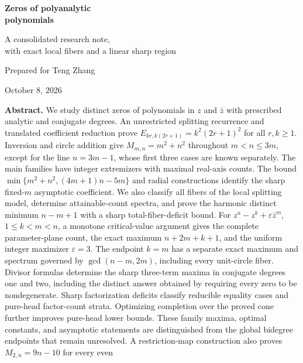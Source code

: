 \documentclass[UTF8,11pt]{ctexart}
\theoremstyle{definition}
\numberwithin{equation}{section}
\begin{document}
\begin{titlepage}
\centering
\vspace*{0.5cm}
{\Huge\bfseries\color{MidnightBlue} Zeros of polyanalytic\\[0.25em] polynomials\par}
\vspace{0.6cm}
{\Large A consolidated research note,\\[0.25em] with exact local fibers and a linear sharp region\par}
\vspace{0.7cm}
{\large Prepared for Teng Zhang\par}
\vspace{0.5cm}
{\large October 8, 2026\par}
\vfill
\begin{tcolorbox}[colback=MidnightBlue!4,colframe=MidnightBlue!50,sharp corners,boxrule=0.5pt,width=0.94\textwidth,fontupper=\small]
\textbf{Abstract.}
We study distinct zeros of polynomials in $z$ and $\bar z$ with
prescribed analytic and conjugate degrees. An unrestricted splitting
recurrence and translated coefficient reduction prove
$E_{kr,k(2r+1)}=k^2(2r+1)^2$ for all $r,k\ge1$.
Inversion and circle addition give
$M_{m,n}=m^2+n^2$ throughout $m<n\le3m$, except for the line
$n=3m-1$, whose first three cases are known separately.
The main families have integer extremizers with maximal real-axis
counts. The bound $\min\{m^2+n^2,(4m+1)n-5m\}$ and radial
constructions identify the sharp fixed-$m$ asymptotic coefficient.
We also classify all fibers of the local splitting model, determine
attainable-count spectra, and prove the harmonic distinct minimum
$n-m+1$ with a sharp total-fiber-deficit bound.
For $z^n-z^k+\varepsilon\bar z^m$, $1\le k<m<n$, a monotone
critical-value argument gives the complete parameter-plane count,
the exact maximum $n+2m+k+1$, and the uniform integer maximizer
$\varepsilon=3$. The endpoint $k=m$ has a separate exact maximum
and spectrum governed by $\gcd(n-m,2m)$, including every
unit-circle fiber. Divisor formulas determine the sharp three-term
maxima in conjugate degrees one and two, including the distinct
answer obtained by requiring every zero to be nondegenerate.
Sharp factorization deficits classify reducible
equality cases and pure-head factor-count strata. Optimizing
completion over the proved cone further improves pure-head
lower bounds. These family maxima, optimal constants, and
asymptotic statements are distinguished from the global
bidegree endpoints that remain unresolved. A restriction-map
construction also proves $M_{2,n}=9n-10$ for every even

\end{tcolorbox}
\end{titlepage}
\end{document}
